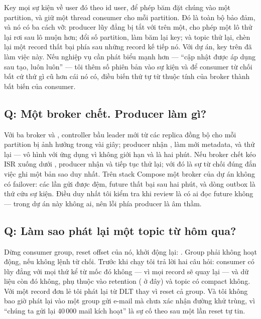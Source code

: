Key mọi sự kiện về user đó theo id user, để phép băm đặt chúng vào một
partition, và giữ một thread consumer cho mỗi partition. Đó là toàn bộ
bảo đảm, và nó có ba cách vỡ: producer lũy đẳng bị tắt với
 trên một, cho phép một lô thử lại rơi sau lô muộn
hơn; đổi số partition, làm băm lại key; và topic thử lại, chèn lại một
record thất bại phía sau những record kế tiếp nó. Với dự án, key
 trên  đã làm việc này. Nếu nghiệp vụ cần
phát biểu mạnh hơn --- ``cập nhật được áp dụng sau tạo, luôn luôn'' ---
tôi thêm số phiên bản vào sự kiện và để consumer từ chối bất cứ thứ gì
cũ hơn cái nó có, điều biến thứ tự từ thuộc tính của broker thành bất
biến của consumer.

\subsection*{Q: Một broker chết. Producer làm gì?}

Với ba broker và , controller bầu leader mới
từ các replica đồng bộ cho mỗi partition bị ảnh hưởng trong vài giây;
producer nhận , làm mới metadata, và thử lại
--- vô hình với ứng dụng vì  không giới hạn và
 là hai phút. Nếu broker chết kéo ISR xuống
dưới , producer nhận 
và tiếp tục thử lại; với  đó là sự từ chối đúng đắn việc
ghi một bản sao duy nhất. Trên stack Compose một broker của dự án không
có failover: các lần gửi được đệm, future thất bại sau hai phút, và dòng
outbox là thứ cứu sự kiện. Điều duy nhất tôi kiểm tra khi review là có
ai đọc future không --- trong dự án này không ai, nên lỗi phía producer
là âm thầm.

\subsection*{Q: Làm sao phát lại một topic từ hôm qua?}

Dừng consumer group, reset offset của nó, khởi động lại:
. Group phải không hoạt động, nếu không lệnh từ chối. Trước
khi chạy tôi trả lời hai câu hỏi: consumer có lũy đẳng với mọi thứ kể
từ mốc đó không --- vì mọi record sẽ quay lại --- và dữ liệu còn đó
không, phụ thuộc vào retention ( ở đây) và topic có compact
không. Với một record đơn lẻ tôi phát lại từ DLT thay vì reset cả group.
Và tôi không bao giờ phát lại vào một group gửi e-mail mà chưa xác nhận
đường khử trùng, vì ``chúng ta gửi lại 40\,000 mail kích hoạt'' là sự cố
theo sau một lần reset tự tin.

